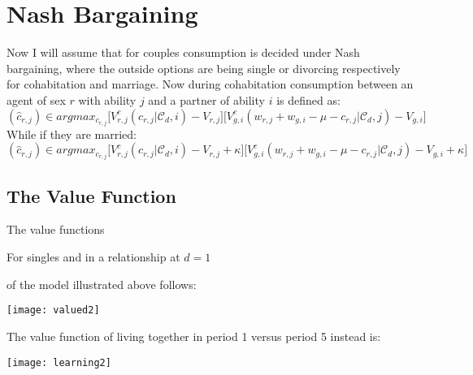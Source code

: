 \documentclass[12pt]{article}
\begin{document}
  \section{Nash Bargaining}
  Now I will assume that for couples consumption is decided under Nash bargaining, where the outside options are being single or divorcing respectively for cohabitation and marriage. Now during cohabitation consumption between an agent of sex $r$ with ability $j$ and a partner of ability $i$ is defined as:
  \begin{equation}
  (\hat{c}_{r,j})\in argmax_{c_{r,j}}\bigg[V^c_{r,j}(c_{r,j}|\mathcal{C}_d,i)-V_{r,j}\bigg]\bigg[V^c_{g,i}(w_{r,j}+w_{g,i}-\mu-c_{r,j}|\mathcal{C}_d,j)-V_{g,i}\bigg]
  \end{equation}
While if they are married:
 \begin{equation}
 (\hat{c}_{r,j})\in argmax_{c_{r,j}}\bigg[V^c_{r,j}(c_{r,j}|\mathcal{C}_d,i)-V_{r,j}+\kappa\bigg]\bigg[V^c_{g,i}(w_{r,j}+w_{g,i}-\mu-c_{r,j}|\mathcal{C}_d,j)-V_{g,i}+\kappa\bigg]
 \end{equation}
 \newpage
  \subsection{The Value Function}
  The value functions\begin{footnote}{For singles and in a relationship at $d=1$} \end{footnote} of the model illustrated above follows:
  \begin{center}
  	\texttt{[image: valued2]}
  \end{center}
  The value function of living together in period 1 versus period 5 instead is:
  \begin{center}
  	\texttt{[image: learning2]}
  \end{center}
 
\end{document}
